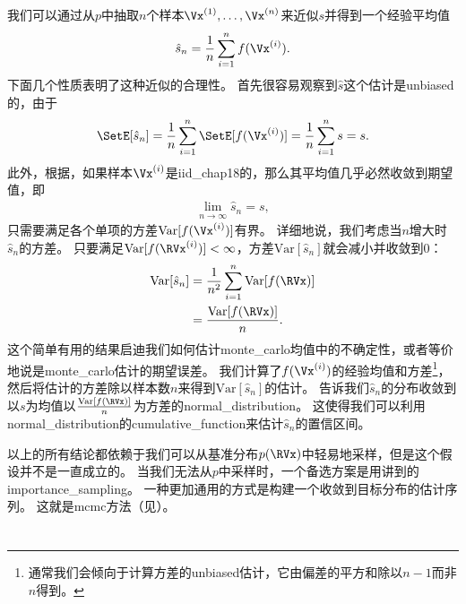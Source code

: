 我们可以通过从$p$中抽取$n$个样本$\Vx^{(1)},\ldots,\Vx^{(n)}$来近似$s$并得到一个经验平均值   
\begin{align}	
\hat{s}_n = \frac{1}{n}\sum_{i=1}^{n}f(\Vx^{(i)}).
\end{align}
下面几个性质表明了这种近似的合理性。
首先很容易观察到$\hat{s}$这个估计是\gls{unbiased}的，由于
\begin{align}
\SetE[\hat{s}_n] = \frac{1}{n}\sum_{i=1}^{n}\SetE[f(\Vx^{(i)})] = \frac{1}{n}\sum_{i=1}^{n}s = s.
\end{align}
此外，根据，如果样本$\Vx^{(i)}$是\gls{iid_chap18}的，那么其平均值几乎必然收敛到期望值，即
\begin{align}
\lim_{n\xrightarrow{}\infty} \hat{s}_n = s,
\end{align}
只需要满足各个单项的方差$\text{Var}[f(\Vx^{(i)})]$有界。 
详细地说，我们考虑当$n$增大时$\hat{s}_n$的方差。
只要满足$\text{Var}[f(\RVx^{(i)})]<\infty$，方差$\text{Var}[\hat{s}_n]$就会减小并收敛到$0$：
\begin{align}
\text{Var}[\hat{s}_n] & = \frac{1}{n^2}\sum_{i=1}^{n}\text{Var}[f(\RVx)]\\
&  = \frac{\text{Var}[f(\RVx)]}{n}.
\end{align}
这个简单有用的结果启迪我们如何估计\gls{monte_carlo}均值中的不确定性，或者等价地说是\gls{monte_carlo}估计的期望误差。 
我们计算了$f(\Vx^{(i)})$的经验均值和方差\footnote{通常我们会倾向于计算方差的\gls{unbiased}估计，它由偏差的平方和除以$n-1$而非$n$得到。}， 
然后将估计的方差除以样本数$n$来得到$\text{Var}[\hat{s}_n]$的估计。
告诉我们$\hat{s}_n$的分布收敛到以$s$为均值以$\frac{\text{Var}[f(\RVx)]}{n}$为方差的\gls{normal_distribution}。
这使得我们可以利用\gls{normal_distribution}的\gls{cumulative_function}来估计$\hat{s}_n$的置信区间。


以上的所有结论都依赖于我们可以从基准分布$p(\RVx)$中轻易地采样，但是这个假设并不是一直成立的。
当我们无法从$p$中采样时，一个备选方案是用讲到的\gls{importance_sampling}。 
一种更加通用的方式是构建一个收敛到目标分布的估计序列。 
这就是\gls{mcmc}方法（见）。

\section{}
\label{sec:importance_sampling_chap17}


